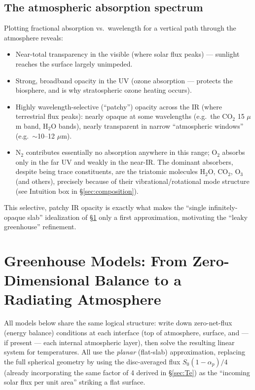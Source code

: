 \documentclass[11pt]{article}
\begin{document}
\subsection{The atmospheric absorption spectrum}
\label{sec:absorption}
Plotting fractional absorption vs.\ wavelength for a vertical path through the atmosphere reveals:
\begin{itemize}[leftmargin=1.4em]
\item Near-total transparency in the visible (where solar flux peaks) — sunlight reaches the surface largely unimpeded.
\item Strong, broadband opacity in the UV (ozone absorption — protects the biosphere, and is why stratospheric ozone heating occurs).
\item Highly wavelength-selective (``patchy'') opacity across the IR (where terrestrial flux peaks): nearly opaque at some wavelengths (e.g.\ the CO$_2$ 15 $\mu$m band, H$_2$O bands), nearly transparent in narrow ``atmospheric windows'' (e.g.\ $\sim$10--12 $\mu$m).
\item N$_2$ contributes essentially no absorption anywhere in this range; O$_2$ absorbs only in the far UV and weakly in the near-IR. The dominant absorbers, despite being trace constituents, are the triatomic molecules H$_2$O, CO$_2$, O$_3$ (and others), precisely because of their vibrational/rotational mode structure (see Intuition box in \S\ref{sec:composition}).
\end{itemize}
This selective, patchy IR opacity is exactly what makes the ``single infinitely-opaque slab'' idealization of \S\ref{sec:greenhouse} only a first approximation, motivating the ``leaky greenhouse'' refinement.

\section{Greenhouse Models: From Zero-Dimensional Balance to a Radiating Atmosphere}
\label{sec:greenhouse}

All models below share the same logical structure: write down zero-net-flux (energy balance) conditions at each interface (top of atmosphere, surface, and — if present — each internal atmospheric layer), then solve the resulting linear system for temperatures. All use the \emph{planar} (flat-slab) approximation, replacing the full spherical geometry by using the disc-averaged flux $S_0(1-\alpha_p)/4$ (already incorporating the same factor of 4 derived in \S\ref{sec:Te}) as the ``incoming solar flux per unit area'' striking a flat surface.
\end{document}
